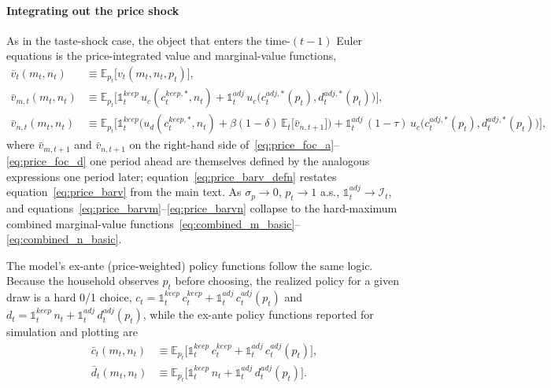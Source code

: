 \paragraph{Integrating out the price shock}
As in the taste-shock case, the object that enters the time-$(t-1)$ Euler equations is the price-integrated value and marginal-value functions,
\begin{align}
	\bar v_t(m_t,n_t) &\equiv \mathbb{E}_{p_t}\big[v_t(m_t,n_t,p_t)\big], \label{eq:price_barv_defn}\\
	\bar v_{m,t}(m_t,n_t) &\equiv \mathbb{E}_{p_t}\Big[\mathbb{1}_t^{keep}\, u_c(c_t^{keep,\ast},n_t) + \mathbb{1}_t^{adj}\, u_c\big(c_t^{adj,\ast}(p_t),d_t^{adj,\ast}(p_t)\big)\Big], \label{eq:price_barvm}\\
	\bar v_{n,t}(m_t,n_t) &\equiv \mathbb{E}_{p_t}\Big[\mathbb{1}_t^{keep}\Big(u_d(c_t^{keep,\ast},n_t) + \beta(1-\delta)\,\mathbb{E}_t\big[\bar v_{n,t+1}\big]\Big) + \mathbb{1}_t^{adj}\,(1-\tau)\, u_c\big(c_t^{adj,\ast}(p_t),d_t^{adj,\ast}(p_t)\big)\Big], \label{eq:price_barvn}
\end{align}
where $\bar v_{m,t+1}$ and $\bar v_{n,t+1}$ on the right-hand side of~\eqref{eq:price_foc_a}--\eqref{eq:price_foc_d} one period ahead are themselves defined by the analogous expressions one period later; equation~\eqref{eq:price_barv_defn} restates equation~\eqref{eq:price_barv} from the main text. As $\sigma_p \to 0$, $p_t \to 1$ a.s., $\mathbb{1}_t^{adj} \to \mathcal{I}_t$, and equations~\eqref{eq:price_barvm}--\eqref{eq:price_barvn} collapse to the hard-maximum combined marginal-value functions~\eqref{eq:combined_m_basic}--\eqref{eq:combined_n_basic}.

The model's ex-ante (price-weighted) policy functions follow the same logic. Because the household observes $p_t$ before choosing, the realized policy for a given draw is a hard 0/1 choice, $c_t = \mathbb{1}_t^{keep}\,c_t^{keep} + \mathbb{1}_t^{adj}\,c_t^{adj}(p_t)$ and $d_t = \mathbb{1}_t^{keep}\,n_t + \mathbb{1}_t^{adj}\,d_t^{adj}(p_t)$, while the ex-ante policy functions reported for simulation and plotting are
\begin{align}
	\bar c_t(m_t,n_t) &\equiv \mathbb{E}_{p_t}\Big[\mathbb{1}_t^{keep}\, c_t^{keep} + \mathbb{1}_t^{adj}\, c_t^{adj}(p_t)\Big], \label{eq:price_barc}\\
	\bar d_t(m_t,n_t) &\equiv \mathbb{E}_{p_t}\Big[\mathbb{1}_t^{keep}\, n_t + \mathbb{1}_t^{adj}\, d_t^{adj}(p_t)\Big]. \label{eq:price_bard}
\end{align}

